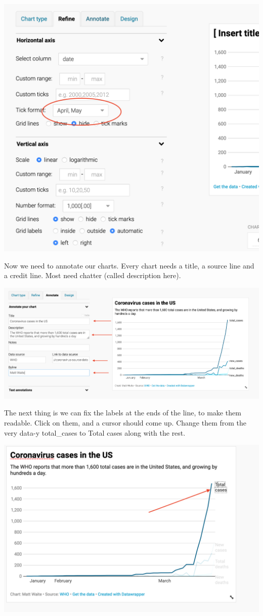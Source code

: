 \documentclass[]{book}
\begin{document}
\includegraphics[width=22.64in]{images/datawrapper4}

Now we need to annotate our charts. Every chart needs a title, a source line and a credit line. Most need chatter (called description here).

\includegraphics[width=42.14in]{images/datawrapper5}

The next thing is we can fix the labels at the ends of the line, to make them readable. Click on them, and a cursor should come up. Change them from the very data-y total\_cases to Total cases along with the rest.

\includegraphics[width=24.97in]{images/datawrapper6}
\end{document}
